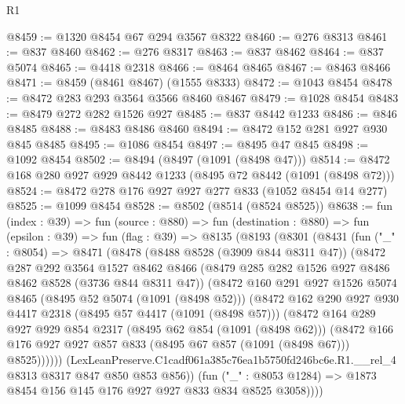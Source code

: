 \begin{lexlean}{R1}
\begin{coremodule}
@8459 := @1320 @8454 @67 @294 @3567 @8322
@8460 := @276 @8313
@8461 := @837 @8460
@8462 := @276 @8317
@8463 := @837 @8462
@8464 := @837 @5074
@8465 := @4418 @2318
@8466 := @8464 @8465
@8467 := @8463 @8466
@8471 := @8459 (@8461 @8467) (@1555 @8333)
@8472 := @1043 @8454
@8478 := @8472 @283 @293 @3564 @3566 @8460 @8467
@8479 := @1028 @8454
@8483 := @8479 @272 @282 @1526 @927
@8485 := @837 @8442 @1233
@8486 := @846 @8485
@8488 := @8483 @8486 @8460
@8494 := @8472 @152 @281 @927 @930 @845 @8485
@8495 := @1086 @8454
@8497 := @8495 @47 @845
@8498 := @1092 @8454
@8502 := @8494 (@8497 (@1091 (@8498 @47)))
@8514 := @8472 @168 @280 @927 @929 @8442 @1233 (@8495 @72 @8442 (@1091 (@8498 @72)))
@8524 := @8472 @278 @176 @927 @927 @277 @833 (@1052 @8454 @14 @277)
@8525 := @1099 @8454
@8528 := @8502 (@8514 (@8524 @8525))
@8638 := fun (index : @39) =>
  fun (source : @880) =>
  fun (destination : @880) =>
  fun (epsilon : @39) =>
  fun (flag : @39) =>
  @8135
    (@8193
      (@8301
        (@8431
          (fun ("_" : @8054) =>
          @8471
            (@8478
              (@8488 @8528 (@3909 @844 @8311 @47))
              (@8472
                @287
                @292
                @3564
                @1527
                @8462
                @8466
                (@8479 @285 @282 @1526 @927 @8486 @8462 @8528 (@3736 @844 @8311 @47))
                (@8472
                  @160
                  @291
                  @927
                  @1526
                  @5074
                  @8465
                  (@8495 @52 @5074 (@1091 (@8498 @52)))
                  (@8472
                    @162
                    @290
                    @927
                    @930
                    @4417
                    @2318
                    (@8495 @57 @4417 (@1091 (@8498 @57)))
                    (@8472
                      @164
                      @289
                      @927
                      @929
                      @854
                      @2317
                      (@8495 @62 @854 (@1091 (@8498 @62)))
                      (@8472
                        @166
                        @176
                        @927
                        @927
                        @857
                        @833
                        (@8495 @67 @857 (@1091 (@8498 @67)))
                        @8525))))))
            (LexLeanPreserve.C1cadf061a385c76ea1b5750fd246bc6e.R1.__rel_4
              @8313
              @8317
              @847
              @850
              @853
              @856))
          (fun ("_" : @8053 @1284) => @1873 @8454 @156 @145 @176 @927 @927 @833 @834 @8525 @3058))))

\end{coremodule}
\end{lexlean}
